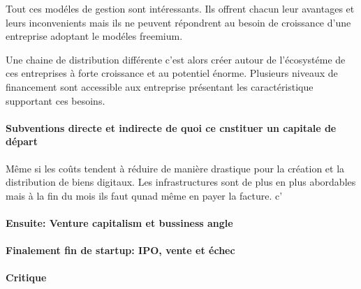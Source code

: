 \documentclass[11pt, a4paper ]{article}
\begin{document}
\begin{spacing}{1.5}
Tout ces modéles de gestion sont intéressants. Ils offrent chacun leur avantages et leurs inconvenients mais ils ne peuvent répondrent au besoin de croissance d'une entreprise adoptant le modéles freemium. 

Une chaine de distribution différente c'est alors créer autour de l'écosystéme de ces entreprises à forte croissance et au potentiel énorme. Plusieurs niveaux de financement sont accessible aux entreprise présentant les caractéristique supportant ces besoins.

		\paragraph{Subventions directe et indirecte de quoi ce cnstituer un capitale de départ}

Même si les coûts tendent à réduire de manière drastique pour la création et la distribution de biens digitaux. Les infrastructures sont de plus en plus abordables mais à la fin du mois ils faut qunad même en payer la facture.
c'



		\paragraph{Ensuite: Venture capitalism et bussiness angle}

		\paragraph{Finalement fin de startup: IPO, vente et échec}



		\paragraph{Critique}



\end{spacing}
\end{document}
